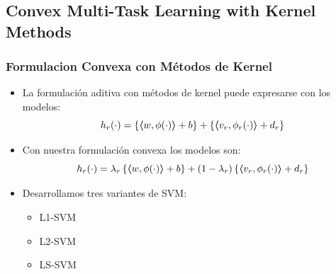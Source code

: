 \documentclass[aspectratio=43]{beamer}
\newcommand{\dotp}[2]{\bm{\left\langle} #1, #2 \bm{\right\rangle}}
\begin{document}
\subsection{Convex Multi-Task Learning with Kernel Methods}

\begin{frame}
      \frametitle{Formulacion Convexa con Métodos de Kernel}

      \begin{itemize}
            \item La formulación aditiva con métodos de kernel puede expresarse con los modelos:
            \begin{equation}
                  \nonumber
                  h_r(\cdot) = \left\lbrace \dotp{w}{\phi(\cdot)} + b  \right\rbrace + \left\lbrace \dotp{{v}_r}{\phi_r(\cdot)} + d_r \right\rbrace
            \end{equation}
            \item Con nuestra formulación convexa los modelos son:
            \begin{equation}
                  \nonumber
                  h_r(\cdot) = \lambda_r \left\lbrace \dotp{w}{\phi(\cdot)} + b  \right\rbrace + (1 - \lambda_r) \left\lbrace \dotp{{v}_r}{\phi_r(\cdot)} + d_r \right\rbrace
            \end{equation}
            \item Desarrollamos tres variantes de SVM:
            \begin{itemize}
                  \item L1-SVM
                  \item L2-SVM
                  \item LS-SVM
            \end{itemize}
      \end{itemize}

\end{frame}
\end{document}
